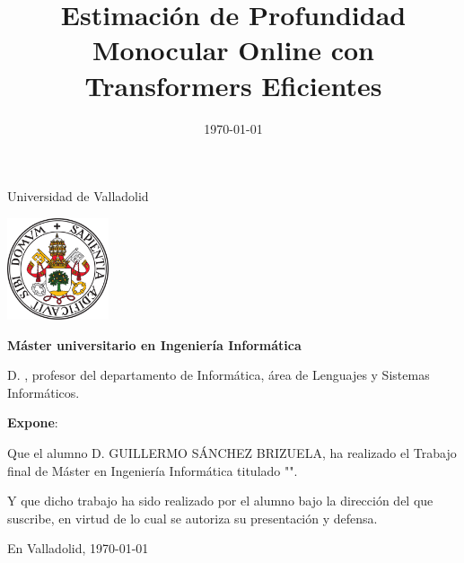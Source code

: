 \documentclass[a4paper,11pt,oneside]{memoir}
\title{Estimación de Profundidad Monocular Online con Transformers Eficientes}
\author{\nombre}
\date{\today}
\newcommand{\nombre}[0]{GUILLERMO SÁNCHEZ BRIZUELA} %
\newcommand{\depto}[0]{Informática}
\newcommand{\areac}[0]{Lenguajes y Sistemas Informáticos}
\begin{document}
\maketitle



\newpage\null\thispagestyle{empty}\newpage


\thispagestyle{empty}


\noindent
\begin{center}%
	{\noindent\Huge Universidad de Valladolid}\vspace{.5cm}%
	
\begin{center}%
	\includegraphics[height=3cm]{imagenes/escudoUVA} \hspace{1cm}
\end{center}%

	{\noindent\Large \textbf{Máster universitario en Ingeniería Informática}}\vspace{.5cm}%
\end{center}%



\noindent D. \makeatletter\@tutor\makeatother, profesor del departamento de \depto, área de \areac.

\noindent \textbf{Expone}:

\noindent Que el alumno D. \nombre, %
ha realizado el Trabajo final de Máster en Ingeniería Informática titulado "\makeatletter\textsc{\@title{}}\makeatother". 

\noindent Y que dicho trabajo ha sido realizado por el alumno bajo la dirección del que suscribe, en virtud de lo cual se autoriza su presentación y defensa.

\begin{center} %
En Valladolid, {\large \today}
\end{center}

\vfill\vfill\vfill

%
\end{document}
